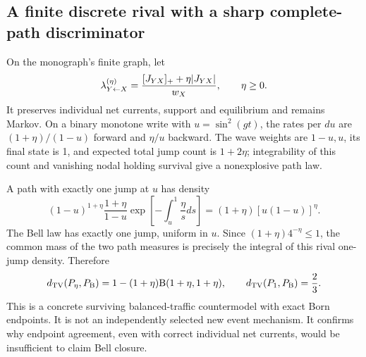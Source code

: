\documentclass[11pt]{article}
\theoremstyle{definition}\newtheorem{assumption}[theorem]{Constitutive assumption}
\theoremstyle{remark}\newtheorem{remark}[theorem]{Remark}
\begin{document}
\subsection{A finite discrete rival with a sharp complete-path discriminator}
On the monograph's finite graph, let
\begin{equation}\label{eq:etarates}
 \lambda^{(\eta)}_{Y\leftarrow X}=
 \frac{[J_{YX}]_++\eta|J_{YX}|}{w_X},\qquad\eta\ge0.
\end{equation}
It preserves individual net currents, support and equilibrium and remains Markov. On a binary monotone write with $u=\sin^2(gt)$, the rates per $du$ are $(1+\eta)/(1-u)$ forward and $\eta/u$ backward. The wave weights are $1-u,u$, its final state is 1, and expected total jump count is $1+2\eta$; integrability of this count and vanishing nodal holding survival give a nonexplosive path law.

A path with exactly one jump at $u$ has density
\[
 (1-u)^{1+\eta}\frac{1+\eta}{1-u}
       \exp\left[-\int_u^1\frac\eta s ds\right]
 =(1+\eta)[u(1-u)]^\eta.
\]
The Bell law has exactly one jump, uniform in $u$. Since $(1+\eta)4^{-\eta}\le1$, the common mass of the two path measures is precisely the integral of this rival one-jump density. Therefore
\begin{equation}\label{eq:exactTV}
 d_{\rm TV}(P_\eta,P_{\rm B})=1-(1+\eta)\mathrm B(1+\eta,1+\eta),
 \qquad d_{\rm TV}(P_1,P_{\rm B})=\frac23.
\end{equation}
This is a concrete surviving balanced-traffic countermodel with exact Born endpoints. It is not an independently selected new event mechanism. It confirms why endpoint agreement, even with correct individual net currents, would be insufficient to claim Bell closure.
\end{document}
